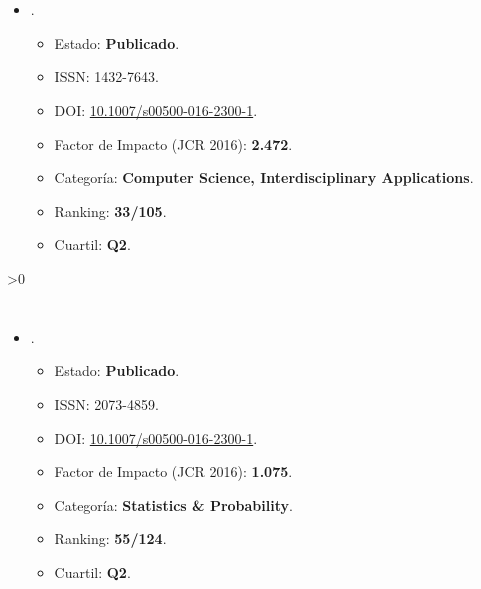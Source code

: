 \documentclass[c5paper,10pt,twoside]{book}	   	%
\newcounter{incluirPDF}
\newcommand{\doi}[1]{\href{https://doi.org/#1}{#1}}
\newcommand{\incluirPaper}[2]{
	\ifnum\value{incluirPDF}>0 {
		
		\clearpage
		
		
		
		\cleardoublepage
		
	}\fi
}
\begin{document}
\clearpage








\section{}

\begin{itemize}
	\item  {}.
	
	\begin{itemize}
		\item Estado: \textbf{Publicado}.
		\item ISSN: 1432-7643.
		\item DOI: \doi{10.1007/s00500-016-2300-1}.
		\item Factor de Impacto (JCR 2016): \textbf{2.472}.
		\item Categoría: \textbf{Computer Science, Interdisciplinary Applications}.
		\item Ranking: \textbf{33/105}.
		\item Cuartil: \textbf{Q2}.
	\end{itemize}
\end{itemize}


\incluirPaper{3-}{./Papers/2016-Luengo-NoiseSD}


\section{}

\begin{itemize}
	\item {}.
	
	\begin{itemize}
		\item Estado: \textbf{Publicado}.
		\item ISSN: 2073-4859.
		\item DOI: \doi{10.1007/s00500-016-2300-1}.
		\item Factor de Impacto (JCR 2016): \textbf{1.075}.
		\item Categoría: \textbf{Statistics \& Probability}.
		\item Ranking: \textbf{55/124}.
		\item Cuartil: \textbf{Q2}.
	\end{itemize}
\end{itemize}
\end{document}
